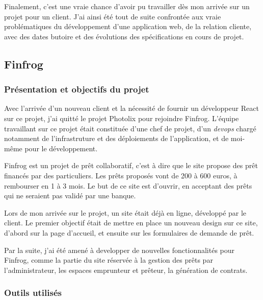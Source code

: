 \bigskip

Finalement, c'est une vraie chance d'avoir pu travailler dès mon arrivée
sur un projet pour un client. J'ai ainsi été tout de suite confrontée
aux vraie problématiques du développement d'une application web, de la
relation cliente, avec des dates butoire et des évolutions des
spécifications en cours de projet.

\subsection{Finfrog}\label{finfrog}

\subsubsection{Présentation et objectifs du
projet}\label{pruxe9sentation-et-objectifs-du-projet-1}

\bigskip

Avec l'arrivée d'un nouveau client et la nécessité de fournir un
développeur React sur ce projet, j'ai quitté le projet Photolix pour
rejoindre Finfrog. L'équipe travaillant sur ce projet était constituée
d'une chef de projet, d'un \emph{devops} chargé notamment de
l'infrastruture et des déploiements de l'application, et de moi-même
pour le développement.

\bigskip

Finfrog est un projet de prêt collaboratif, c'est à dire que le site
propose des prêt financés par des particuliers. Les prêts proposés vont
de 200 à 600 euros, à rembourser en 1 à 3 mois. Le but de ce site est
d'ouvrir, en acceptant des prêts qui ne seraient pas validé par une
banque.

\bigskip

Lors de mon arrivée sur le projet, un site était déjà en ligne,
développé par le client. Le premier objectif était de mettre en place un
nouveau design sur ce site, d'abord sur la page d'accueil, et ensuite
sur les formulaires de demande de prêt.

\bigskip

Par la suite, j'ai été amené à developper de nouvelles fonctionnalités
pour Finfrog, comme la partie du site réservée à la gestion des prêts
par l'administrateur, les espaces emprunteur et prêteur, la génération
de contrats.

\subsubsection{Outils utilisés}\label{outils-utilisuxe9s-1}

